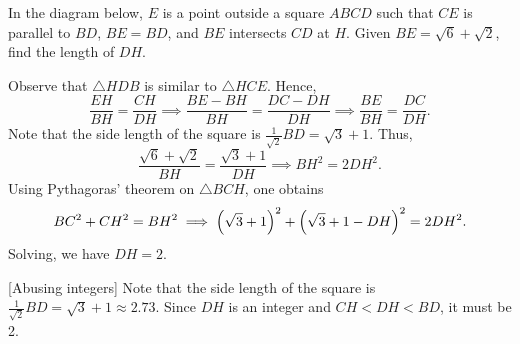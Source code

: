 \clearpage
\begin{question}[2]\label{A::2022-O-1-19}
    In the diagram below, $E$ is a point outside a square $ABCD$ such that $CE$ is parallel to $BD$, $BE = BD$, and $BE$ intersects $CD$ at $H$. Given $BE = \sqrt6 + \sqrt2$, find the length of $DH$.

    \begin{center}
    \end{center}
\end{question}

 Observe that $\triangle HDB$ is similar to $\triangle HCE$. Hence, \[\frac{EH}{BH} = \frac{CH}{DH} \implies \frac{BE-BH}{BH} = \frac{DC-DH}{DH} \implies \frac{BE}{BH} = \frac{DC}{DH}.\] Note that the side length of the square is $\frac1{\sqrt2} BD = \sqrt3 + 1$. Thus, \[\frac{\sqrt6 + \sqrt2}{BH} = \frac{\sqrt3 + 1}{DH} \implies BH^2 = 2DH^2.\] Using Pythagoras' theorem on $\triangle BCH$, one obtains \[BC^2 + CH^2 = BH^2 \implies \left( \sqrt3 + 1 \right)^2 + \left( \sqrt3 + 1 - DH \right)^2 = 2DH^2.\] Solving, we have $DH = 2$.

[Abusing integers] Note that the side length of the square is $\frac1{\sqrt2} BD = \sqrt3 + 1 \approx 2.73$. Since $DH$ is an integer and $CH < DH < BD$, it must be 2.

